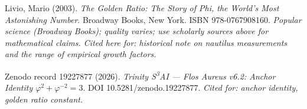 \bigskip
\noindent
[E5] Livio, Mario (2003).
\emph{The Golden Ratio: The Story of Phi, the World's Most Astonishing
Number}.
Broadway Books, New York.
ISBN 978-0767908160.
\quad \textit{Popular science (Broadway Books); quality varies; use
scholarly sources above for mathematical claims.  Cited here
for: historical note on nautilus measurements and the range of
empirical growth factors.}
\cite{livio_phi}

\bigskip
\noindent
[E6] Zenodo record 19227877 (2026).
\emph{Trinity S\textsuperscript{3}AI — Flos Aureus v6.2:
Anchor Identity \(\varphi^2+\varphi^{-2}=3\)}.
DOI 10.5281/zenodo.19227877.
\quad \textit{Cited for: anchor identity, golden ratio constant.}
\cite{zenodo_trinity}



